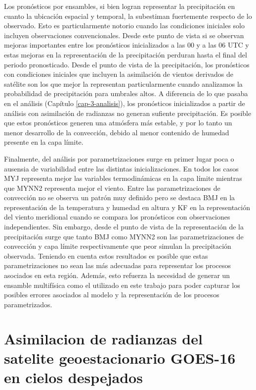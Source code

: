 \documentclass[12pt,oneside,a4paper]{reedthesis}
\begin{document}
Los pronósticos por ensambles, si bien logran representar la precipitación en cuanto la ubicación espacial y temporal, la subestiman fuertemente respecto de lo observado. Esto es particularmente notorio cuando las condiciones iniciales solo incluyen observaciones convencionales. Desde este punto de vista si se observan mejoras importantes entre los pronósticos inicializados a las 00 y a las 06 UTC y estas mejoras en la representación de la precipitación perduran hasta el final del periodo pronosticado. Desde el punto de vista de la precipitación, los pronósticos con condiciones iniciales que incluyen la asimilación de vientos derivados de satélite son los que mejor la representan particularmente cuando analizamos la probabilidad de precipitación para umbrales altos. A diferencia de lo que pasaba en el análisis (Capítulo \ref{cap-3-analisis}), los pronósticos inicializados a partir de análisis con asimilación de radianzas no generan sufiente precipitación. Es posible que estos pronósticos generen una atmósfera más estable, y por lo tanto un menor desarrollo de la convección, debido al menor contenido de humedad presente en la capa límite.

Finalmente, del análisis por parametrizaciones surge en primer lugar poca o ausensia de variabilidad entre las distintas inicializaciones. En todos los casos MYJ representa mejor las variables termodinámicas en la capa límite mientras que MYNN2 representa mejor el viento. Entre las parametrizaciones de convección no se observa un patrón muy definido pero se destaca BMJ en la representación de la temperatura y humedad en altura y KF en la representación del viento meridional cuando se compara los pronósticos con observaciones independientes. Sin embargo, desde el punto de vista de la representación de la precipitación surge que tanto BMJ como MYNN2 son las parametrizaciones de convección y capa límite respectivamente que peor simulan la precipitación observada. Teniendo en cuenta estos resultados es posible que estas parametrizaciones no sean las más adecuadas para representar los procesos asociados en esta región. Además, esto refuerza la necesidad de generar un ensamble multifísica como el utilizado en este trabajo para poder capturar los posibles errores asociados al modelo y la representación de los procesos parametrizados.

\hypertarget{cap-5-goes}{%
\chapter{Asimilacion de radianzas del satelite geoestacionario GOES-16 en cielos despejados}\label{cap-5-goes}}
\end{document}
